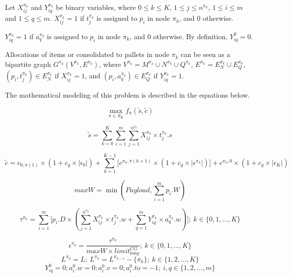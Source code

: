 \documentclass[preprint,authoryear]{elsarticle}
\begin{document}
Let $X_{ij}^{\pi_k}$ and $Y_{iq}^{\pi_k}$ be binary variables, where $0 \leq k \leq K$, $1 \leq j \leq n^{\pi_k}$, $1 \leq i \leq m$ and $1 \leq q \leq m$. $X_{ij}^{\pi_k} = 1$ if $t_j^{\pi_k}$ is assigned to $p_i$ in node $\pi_k$, and 0 otherwise.

$Y_{iq}^{\pi_k} = 1$ if $a_q^{\pi_k}$ is assigned to $p_i$ in node $\pi_k$, and 0 otherwise. By definition, $Y_{iq}^0=0$.

Allocations of items or consolidated to pallets in node $\pi_k$ can be seen as a bipartite graph $G^{\pi_k}(V^{\pi_k}, E^{\pi_k})$,
where $V^{\pi_k} = M^{\pi_k} \cup N^{\pi_k} \cup Q^{\pi_k}$, $E^{\pi_k} = E_N^{\pi_k} \cup E_Q^{\pi_k}$,
$(p_i, t_j^{\pi_k}) \in E_N^{\pi_k}$
if $X_{ij}^{\pi_k} = 1$, and $(p_i, a_q^{\pi_k}) \in E_Q^{\pi_k}$ if $Y_{iq}^{\pi_k} = 1$.

The mathematical modeling of this problem is described in the equations below.


\begin{equation} \label{eq:maxf}
	\max_{\pi \in S_K} f_\pi(\tilde{s},\tilde{c})
\end{equation}

\begin{equation} \label{eq:scores}
	\tilde{s} = \sum_{k=0}^{K} \sum_{i=1}^{m} \sum_{j=1}^{n^{\pi_k}} X_{ij}^{\pi_k} \times t_j^{\pi_k}.s
\end{equation}

\begin{equation} \label{eq:costs}
	\tilde{c} = c_{0,\pi(1)}\times(1+c_g\times|\epsilon_0|) + \sum_{k=1}^{K-1} \Big [ c^{\pi_k, \pi(k+1)}\times(1+c_g\times|\epsilon^{\pi_k}|) \Big ] + c^{\pi_k,0}\times(1+c_g\times|\epsilon_K|)
\end{equation}

\begin{equation} \label{eq:maxW}
	maxW = \min(Payload, \sum_{i=1}^{m}p_i.W)
\end{equation}

\begin{equation} \label{eq:tau}
\tau^{\pi_k} = \sum_{i=1}^{m} \Big [ p_i.D \times (\sum_{j=1}^{n^{\pi_k}} X_{ij}^{\pi_k} \times t_j^{\pi_k}.w +  \sum_{q=1}^{m} Y_{iq}^{\pi_k} \times a_q^{\pi_k}.w) \Big ];\ k \in \{0, 1, \ldots, K\}
\end{equation}

\begin{equation} \label{eq:eps}
\epsilon^{\pi_k} = \frac{\tau^{\pi_k}}{maxW \times limit^{CG}_{long}};\ k \in \{0, 1, \ldots, K\}
\end{equation}
{\color{blue}
\begin{equation} \label{eq:pdp11}
	L^{\pi_0} = L;\ L^{\pi_k} = L^{\pi_{k-1}} - \{\pi_k\}; \ k \in \{1, 2, \ldots, K\}
\end{equation}
}
\begin{equation} \label{eq:pdp13}
	Y^0_{iq} = 0; a^0_i.w = 0; a^0_i.v = 0; a^0_i.to = -1;\ i,q \in \{1, 2, \ldots, m\}
\end{equation}
\end{document}
